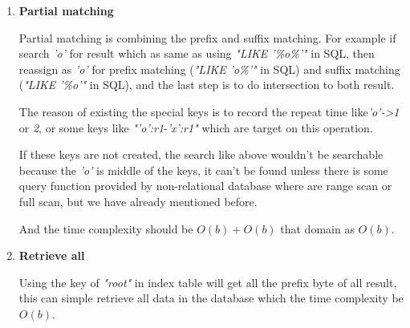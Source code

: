 \begin{enumerate}

\item \textbf{Partial matching}

Partial matching is combining the prefix and suffix matching. For example if search \textit{'o'} for result which as same as using \textit{"LIKE '\%o\%'"} in SQL, then reassign as \textit{'o'} for prefix matching (\textit{"LIKE 'o\%'"} in SQL) and suffix matching (\textit{"LIKE '\%o'"} in SQL), and the last step is to do intersection to both result.

The reason of existing the special keys is to record the repeat time like\textit{'o'-\textgreater1} or \textit{2}, or some keys like \textit{"'o':r1}-\textit{'x':r1"} which are target on this operation.

If these keys are not created, the search like above wouldn't be searchable because the \textit{'o'} is middle of the keys, it can't be found unless there is some query function provided by non-relational database where are  range scan or full scan, but we have already mentioned before.

And the time complexity should be $O(b) + O(b)$ that domain as $O(b)$.


\item \textbf{Retrieve all}

Using the key of \textit{"root"} in index table will get all the prefix byte of all result, this can simple retrieve all data in the database which the time complexity be $O(b)$.


\end{enumerate}
